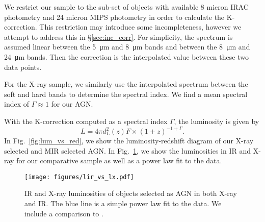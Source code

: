 \documentclass[twocolumn, trackchanges]{aastex63}
\newcommand{\jr}[1]{{\color{purple}[JR: #1]}}
\begin{document}
We restrict our sample to the sub-set of objects with available 8 micron IRAC photometry and 24 micron MIPS photometry in order to calculate the K-correction.
This restriction may introduce some incompleteness, however we attempt to address this in \S\ref{sec:inc_corr}.
For simplicity, the spectrum is assumed linear between the \SI{5}{\micro m} and \SI{8}{\micro m} bands and between the \SI{8}{\micro m} and \SI{24}{\micro m} bands. 
Then the correction is the interpolated value between these two data points.

For the X-ray sample, we similarly use the interpolated spectrum between the soft and hard bands to determine the spectral index.
We find a mean spectral index of $\Gamma\approx 1$ for our AGN.

With the K-correction computed as a spectral index $\Gamma$, the luminosity is given by
\begin{equation}
L = 4\pi d_L^2(z) F \times (1 + z)^{-1 + \Gamma}.
\end{equation}
In Fig.~\ref{fig:lum_vs_red}, we show the luminosity-redshift diagram of our X-ray selected and MIR selected AGN.
In Fig.~\ref{fig:lvsl}, we show the luminosities in IR and X-ray for our comparative sample as well as a power law fit to the data.

\begin{figure}[hptb]
\centering
\texttt{[image: figures/lir\_vs\_lx.pdf]}
\caption{IR and X-ray luminosities of objects selected as AGN in both X-ray and IR. The blue line is a simple power law fit to the data. We include a comparison to \cite{chen_x-ray_2017}.}
\label{fig:lvsl}
\end{figure}


\end{document}
